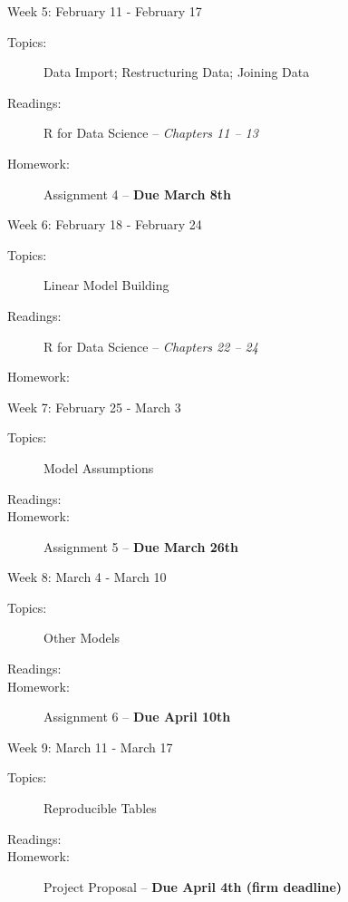 \documentclass[11pt,article,oneside]{memoir}
\newcounter{schedule}
\begin{document}
\begin{schedule}{Week 5: February 11 - February 17}
\begin{description}
\item[Topics:] Data Import; Restructuring Data; Joining Data

\item[Readings:] R for Data Science -- \textit{Chapters 11 -- 13}

\item[Homework:] Assignment 4 -- \textbf{Due March 8th}
\end{description}
\end{schedule}
\begin{schedule}{Week 6: February 18 - February 24}
\begin{description}
\item[Topics:] Linear Model Building

\item[Readings:] R for Data Science -- \textit{Chapters 22 -- 24}

\item[Homework:]

\end{description}
\end{schedule}

\begin{schedule}{Week 7: February 25 - March 3}
\begin{description}
\item[Topics:] Model Assumptions

\item[Readings:] 

\item[Homework:] Assignment 5 -- \textbf{Due March 26th}

\end{description}
\end{schedule}

\begin{schedule}{Week 8: March 4 - March 10}
\begin{description}
\item[Topics:] Other Models 

\item[Readings:] 

\item[Homework:] Assignment 6 -- \textbf{Due April 10th}

\end{description}
\end{schedule}
\begin{schedule}{Week 9: March 11 - March 17}
\begin{description}
\item[Topics:] Reproducible Tables 

\item[Readings:] 

\item[Homework:] Project Proposal -- \textbf{Due April 4th (firm deadline)}

\end{description}
\end{schedule}
\end{document}
